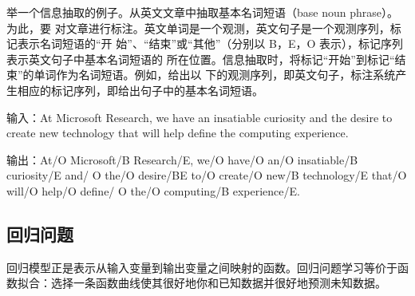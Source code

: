 举一个信息抽取的例子。从英文文章中抽取基本名词短语（base noun phrase）。为此，要
对文章进行标注。英文单词是一个观测，英文句子是一个观测序列，标记表示名词短语的“开
始”、“结束”或“其他”（分别以 B，E，O 表示），标记序列表示英文句子中基本名词短语的
所在位置。信息抽取时，将标记“开始”到标记“结束”的单词作为名词短语。例如，给出以
下的观测序列，即英文句子，标注系统产生相应的标记序列，即给出句子中的基本名词短语。

输入：At Microsoft Research, we have an insatiable curiosity and the desire to create
new technology that will help define the computing experience.

输出：At/O Microsoft/B Research/E, we/O have/O an/O insatiable/B curiosity/E and/
O the/O desire/BE to/O create/O new/B technology/E that/O will/O help/O define/
O the/O computing/B experience/E.
\subsection{回归问题}
回归模型正是表示从输入变量到输出变量之间映射的函数。回归问题学习等价于函数拟合：选择一条函数曲线使其很好地你和已知数据并很好地预测未知数据。
